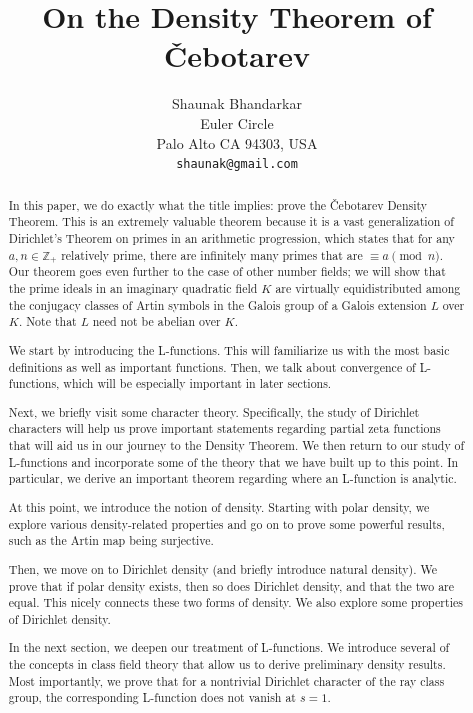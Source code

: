 \documentclass{article}
\title{On the Density Theorem of Čebotarev}
\author{
  Shaunak Bhandarkar\\
  Euler Circle\\
  Palo Alto CA 94303, USA \\
  \texttt{shaunak@gmail.com} \\
}
\newcommand{\ZZ}{\mathbb{Z}}
\theoremstyle{plain}
\theoremstyle{definition}
\theoremstyle{remark}
\numberwithin{equation}{section}
\numberwithin{thm}{section}
\begin{document}
\maketitle

\begin{abstract}

In this paper, we do exactly what the title implies: prove the Čebotarev Density Theorem. This is an extremely valuable theorem because it is a vast generalization of Dirichlet's Theorem on primes in an arithmetic progression, which states that for any $a, n \in \ZZ_{+}$ relatively prime, there are infinitely many primes that are $\equiv a \pmod{n}$. Our theorem goes even further to the case of other number fields; we will show that the prime ideals in an imaginary quadratic field $K$ are virtually equidistributed among the conjugacy classes of Artin symbols in the Galois group of a Galois extension $L$ over $K$. Note that $L$ need not be abelian over $K$.  

We start by introducing the L-functions. This will familiarize us with the most basic definitions as well as important functions. Then, we talk about convergence of L-functions, which will be especially important in later sections. 

Next, we briefly visit some character theory. Specifically, the study of Dirichlet characters will help us prove important statements regarding partial zeta functions that will aid us in our journey to the Density Theorem. We then return to our study of L-functions and incorporate some of the theory that we have built up to this point. In particular, we derive an important theorem regarding where an L-function is analytic.

At this point, we introduce the notion of density. Starting with polar density, we explore various density-related properties and go on to prove some powerful results, such as the Artin map being surjective. 

Then, we move on to Dirichlet density (and briefly introduce natural density). We prove that if polar density exists, then so does Dirichlet density, and that the two are equal. This nicely connects these two forms of density. We also explore some properties of Dirichlet density.

In the next section, we deepen our treatment of L-functions. We introduce several of the concepts in class field theory that allow us to derive preliminary density results. Most importantly, we prove that for a nontrivial Dirichlet character of the ray class group, the corresponding L-function does not vanish at $s = 1$. 


\end{abstract}
\end{document}
